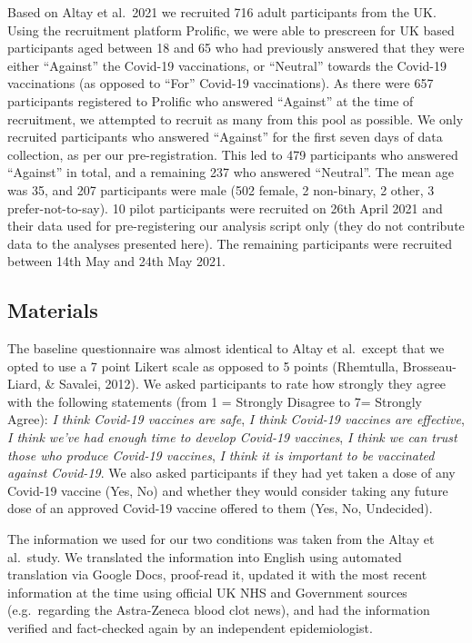 \documentclass[
  english,
  ,jou,floatsintext]{apa6}
\begin{document}
Based on Altay et al.~2021 we recruited 716 adult participants from the UK. Using the recruitment platform Prolific, we were able to prescreen for UK based participants aged between 18 and 65 who had previously answered that they were either ``Against'' the Covid-19 vaccinations, or ``Neutral'' towards the Covid-19 vaccinations (as opposed to ``For'' Covid-19 vaccinations). As there were 657 participants registered to Prolific who answered ``Against'' at the time of recruitment, we attempted to recruit as many from this pool as possible. We only recruited participants who answered ``Against'' for the first seven days of data collection, as per our pre-registration. This led to 479 participants who answered ``Against'' in total, and a remaining 237 who answered ``Neutral''. The mean age was 35, and 207 participants were male (502 female, 2 non-binary, 2 other, 3 prefer-not-to-say). 10 pilot participants were recruited on 26th April 2021 and their data used for pre-registering our analysis script only (they do not contribute data to the analyses presented here). The remaining participants were recruited between 14th May and 24th May 2021.

\hypertarget{materials}{%
\subsection{Materials}\label{materials}}

The baseline questionnaire was almost identical to Altay et al.~except that we opted to use a 7 point Likert scale as opposed to 5 points (Rhemtulla, Brosseau-Liard, \& Savalei, 2012). We asked participants to rate how strongly they agree with the following statements (from 1 = Strongly Disagree to 7= Strongly Agree): \emph{I think Covid-19 vaccines are safe}, \emph{I think Covid-19 vaccines are effective}, \emph{I think we've had enough time to develop Covid-19 vaccines}, \emph{I think we can trust those who produce Covid-19 vaccines}, \emph{I think it is important to be vaccinated against Covid-19}. We also asked participants if they had yet taken a dose of any Covid-19 vaccine (Yes, No) and whether they would consider taking any future dose of an approved Covid-19 vaccine offered to them (Yes, No, Undecided).

The information we used for our two conditions was taken from the Altay et al.~study. We translated the information into English using automated translation via Google Docs, proof-read it, updated it with the most recent information at the time using official UK NHS and Government sources (e.g.~regarding the Astra-Zeneca blood clot news), and had the information verified and fact-checked again by an independent epidemiologist.
\end{document}

